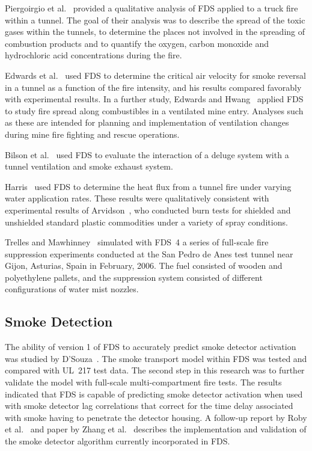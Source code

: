 Piergoirgio et al.~\cite{Piergiorgio:1} provided a qualitative analysis of FDS applied to a truck fire within a tunnel. The goal of their analysis was to describe the spread of the toxic gases within the tunnels, to determine the places not involved in the spreading of combustion products and to quantify the oxygen, carbon monoxide and hydrochloric acid concentrations during the fire.

Edwards et al.~\cite{Edwards:SME2005,Edwards:FSJ} used FDS to determine the critical air velocity for smoke reversal in a tunnel as a function of the fire intensity, and his results compared favorably with  experimental results.  In a  further study,  Edwards and Hwang~\cite{Edwards:SME2006} applied FDS to study fire spread along combustibles in a ventilated mine entry. Analyses such as these are intended for planning and implementation of ventilation changes during mine fire fighting and rescue operations.

Bilson et al.~\cite{Bilson:2008} used FDS to evaluate the interaction of a deluge system with a tunnel ventilation and smoke exhaust system.

Harris~\cite{Harris:ISTSS2010} used FDS to determine the heat flux from a tunnel fire under varying water application rates. These results were qualitatively consistent with experimental results of Arvidson~\cite{Arvidson:ISTSS2010}, who conducted burn tests for shielded and unshielded standard plastic commodities under a variety of spray conditions.

Trelles and Mawhinney~\cite{Trelles:JFPE2010,Mawhinney:FT2012} simulated with FDS~4 a series of full-scale fire suppression experiments conducted at the San Pedro de Anes test tunnel near Gijon, Asturias, Spain in February, 2006. The fuel consisted of wooden and polyethylene pallets, and the suppression system consisted of different configurations of water mist nozzles.




\subsection{Smoke Detection}

The ability of version 1 of FDS to accurately predict smoke detector activation was studied by D'Souza~\cite{DSouza:1}. The smoke transport model within FDS was tested and compared with UL~217 test data. The second step in this research was to further validate the model with full-scale multi-compartment fire tests. The results indicated that FDS is capable of predicting smoke detector activation when used with smoke detector lag correlations that correct for the time delay associated with smoke having to penetrate the detector housing. A follow-up report by Roby et al.~\cite{CSE_GCR} and paper by Zhang et al.~\cite{Zhang:FSJ2008} describes the implementation and validation of the smoke detector algorithm currently incorporated in FDS.

